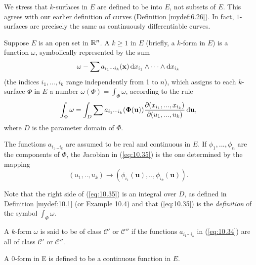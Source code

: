 We stress that $k$-surfaces in $E$ are defined to be  into $E$, not subsets of $E$.
This agrees with our earlier definition of curves (Definition \ref{mydef:6.26}).
In fact, $1$-surfaces are precisely the same as continuously differentiable curves.

\begin{mydef}
    \label{mydef:10.11}
    Suppose $E$ is an open set in ${\protect\mathbb R}^n$.
    A  $k \geq 1$ in $E$
    (briefly, a $k$-form in $E$) is a function $\omega$,
    symbolically represented by the sum
    \begin{equation}
        \label{eq:10.34}
        \omega - \sum a_{i_1 \cdots i_k} (\mathbf{x})
        \d x_{i_1} \wedge \cdots \wedge
        \d x_{i_k}
    \end{equation}
    (the indices $i_1 , ... , i_k$ range independently from 1 to $n$), which assigns to each $k$-surface $\Phi$ in $E$ a number $\omega(\Phi) = \int_{\Phi} \omega$,
    according to the rule
    \begin{equation}
        \label{eq:10.35}
        \int_{\Phi} \omega =
        \int_{D} \sum a_{i_1 \cdots i_k} (\mathbf{\Phi(u)}) \frac{\partial (x_{i_1},...,x_{i_k})}{\partial (u_{1},...,u_{k})} \d \mathbf{u} ,
    \end{equation}
    where $D$ is the parameter domain of $\Phi$.

    The functions $a_{i_1 \dots i_k}$ are assumed to be real and continuous in $E$.
    If $\phi_1 , ... , \phi_n$ are the components of $\Phi$, the Jacobian in (\ref{eq:10.35}) is the one determined by the mapping
    \begin{equation*}
        (u_1,..,u_k) \rightarrow
        (\phi_{i_1}(\mathbf{u}),..,\phi_{i_k}(\mathbf{u})) .
    \end{equation*}

    Note that the right side of (\ref{eq:10.35}) is an integral over $D$, as defined in Definition \ref{mydef:10.1} (or Example 10.4) and that (\ref{eq:10.35}) is the \emph{definition} of the symbol $\int_{\Phi} \omega$.

    A $k$-form $\omega$ is said to be of class $\mathscr{C}'$ or $\mathscr{C}''$
    if the functions $a_{i_1 \cdots i_k}$ in (\ref{eq:10.34}) are all of class $\mathscr{C}'$ or $\mathscr{C}''$.

    A 0-form in E is defined to be a continuous function in $E$.
\end{mydef}


